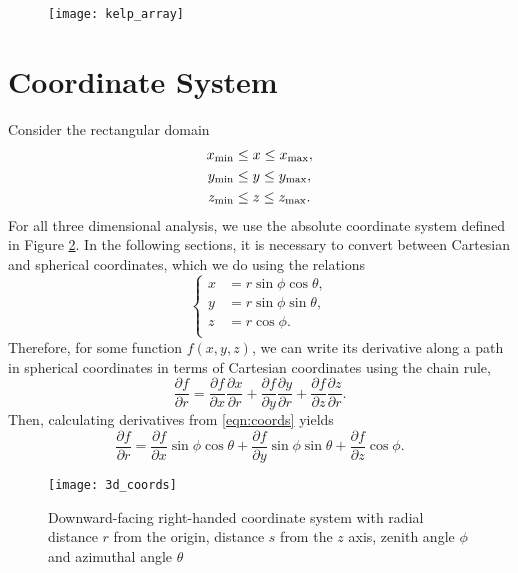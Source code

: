 \begin{figure}[H]
	\centering
	\texttt{[image: kelp\_array]}
  \label{fig:kelp_array}
\end{figure}

\section{Coordinate System}
Consider the rectangular domain
\begin{align*}
  {x_{\min}} &\leq x \leq {x_{\max}}, \\
  {y_{\min}} &\leq y \leq {y_{\max}}, \\
  {z_{\min}} &\leq z \leq {z_{\max}}.
\end{align*}
For all three dimensional analysis, we use the absolute coordinate system defined in Figure \ref{fig:3dcoords}.
In the following sections, it is necessary to convert between Cartesian and spherical coordinates, which we do using the relations
\begin{equation}
  \left\{
	\begin{split}
		x & = r\sin\phi\cos\theta, \\
		y & = r\sin\phi\sin\theta, \\
		z & = r\cos\phi. \\
	\end{split}
  \right.
	\label{eqn:coords}
\end{equation}
Therefore, for some function $f(x,y,z)$, we can write its derivative along a path in spherical coordinates in terms of Cartesian coordinates using the chain rule,
\begin{equation*}
	\frac{\partial f}{\partial r} 
	=\frac{\partial f}{\partial x}\frac{\partial x}{\partial r} 
	+ \frac{\partial f}{\partial y}\frac{\partial y}{\partial r} 
	+ \frac{\partial f}{\partial z}\frac{\partial z}{\partial r}.
\end{equation*}
Then, calculating derivatives from \eqref{eqn:coords} yields
\begin{equation}
	\frac{\partial f}{\partial r} 
	=\frac{\partial f}{\partial x}\sin\phi\cos\theta
	+ \frac{\partial f}{\partial y}\sin\phi\sin\theta
	+ \frac{\partial f}{\partial z}\cos\phi.
	\label{eqn:partials}
\end{equation}
\begin{figure}[H]
	\centering
	\texttt{[image: 3d\_coords]}
	\caption{Downward-facing right-handed coordinate system with radial distance $r$ from the origin, distance $s$ from the $z$ axis, zenith angle $\phi$ and azimuthal angle $\theta$}
	\label{fig:3dcoords}
\end{figure}


